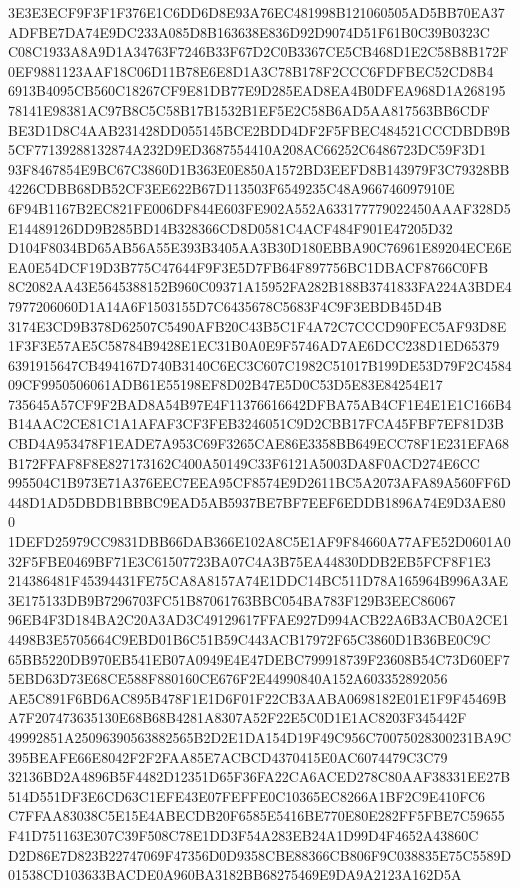 \documentclass[UTF8,fontset=fandol,zihao=-4,a4paper]{ctexart}
\begin{document}
{{3E3E3ECF9F3F1F376E1C6DD6D8E93A76EC481998B121060505AD5BB70EA37ADFBE7DA74E9DC233A085D8B163638E836D92D9074D51F61B0C39B0323C
C08C1933A8A9D1A34763F7246B33F67D2C0B3367CE5CB468D1E2C58B8B172F0EF9881123AAF18C06D11B78E6E8D1A3C78B178F2CCC6FDFBEC52CD8B4
6913B4095CB560C18267CF9E81DB77E9D285EAD8EA4B0DFEA968D1A26819578141E98381AC97B8C5C58B17B1532B1EF5E2C58B6AD5AA817563BB6CDF
BE3D1D8C4AAB231428DD055145BCE2BDD4DF2F5FBEC484521CCCDBDB9B5CF77139288132874A232D9ED3687554410A208AC66252C6486723DC59F3D1
93F8467854E9BC67C3860D1B363E0E850A1572BD3EEFD8B143979F3C79328BB4226CDBB68DB52CF3EE622B67D113503F6549235C48A966746097910E
6F94B1167B2EC821FE006DF844E603FE902A552A633177779022450AAAF328D5E14489126DD9B285BD14B328366CD8D0581C4ACF484F901E47205D32
D104F8034BD65AB56A55E393B3405AA3B30D180EBBA90C76961E89204ECE6EEA0E54DCF19D3B775C47644F9F3E5D7FB64F897756BC1DBACF8766C0FB
8C2082AA43E5645388152B960C09371A15952FA282B188B3741833FA224A3BDE47977206060D1A14A6F1503155D7C6435678C5683F4C9F3EBDB45D4B
3174E3CD9B378D62507C5490AFB20C43B5C1F4A72C7CCCD90FEC5AF93D8E1F3F3E57AE5C58784B9428E1EC31B0A0E9F5746AD7AE6DCC238D1ED65379
6391915647CB494167D740B3140C6EC3C607C1982C51017B199DE53D79F2C458409CF9950506061ADB61E55198EF8D02B47E5D0C53D5E83E84254E17
735645A57CF9F2BAD8A54B97E4F11376616642DFBA75AB4CF1E4E1E1C166B4B14AAC2CE81C1A1AFAF3CF3FEB3246051C9D2CBB17FCA45FBF7EF81D3B
CBD4A953478F1EADE7A953C69F3265CAE86E3358BB649ECC78F1E231EFA68B172FFAF8F8E827173162C400A50149C33F6121A5003DA8F0ACD274E6CC
995504C1B973E71A376EEC7EEA95CF8574E9D2611BC5A2073AFA89A560FF6D448D1AD5DBDB1BBBC9EAD5AB5937BE7BF7EEF6EDDB1896A74E9D3AE800
1DEFD25979CC9831DBB66DAB366E102A8C5E1AF9F84660A77AFE52D0601A032F5FBE0469BF71E3C61507723BA07C4A3B75EA44830DDB2EB5FCF8F1E3
214386481F45394431FE75CA8A8157A74E1DDC14BC511D78A165964B996A3AE3E175133DB9B7296703FC51B87061763BBC054BA783F129B3EEC86067
96EB4F3D184BA2C20A3AD3C49129617FFAE927D994ACB22A6B3ACB0A2CE14498B3E5705664C9EBD01B6C51B59C443ACB17972F65C3860D1B36BE0C9C
65BB5220DB970EB541EB07A0949E4E47DEBC799918739F23608B54C73D60EF75EBD63D73E68CE588F880160CE676F2E44990840A152A603352892056
AE5C891F6BD6AC895B478F1E1D6F01F22CB3AABA0698182E01E1F9F45469BA7F207473635130E68B68B4281A8307A52F22E5C0D1E1AC8203F345442F
49992851A25096390563882565B2D2E1DA154D19F49C956C70075028300231BA9C395BEAFE66E8042F2F2FAA85E7ACBCD4370415E0AC6074479C3C79
32136BD2A4896B5F4482D12351D65F36FA22CA6ACED278C80AAF38331EE27B514D551DF3E6CD63C1EFE43E07FEFFE0C10365EC8266A1BF2C9E410FC6
C7FFAA83038C5E15E4ABECDB20F6585E5416BE770E80E282FF5FBE7C59655F41D751163E307C39F508C78E1DD3F54A283EB24A1D99D4F4652A43860C
D2D86E7D823B22747069F47356D0D9358CBE88366CB806F9C038835E75C5589D01538CD103633BACDE0A960BA3182BB68275469E9DA9A2123A162D5A
}}
\end{document}
